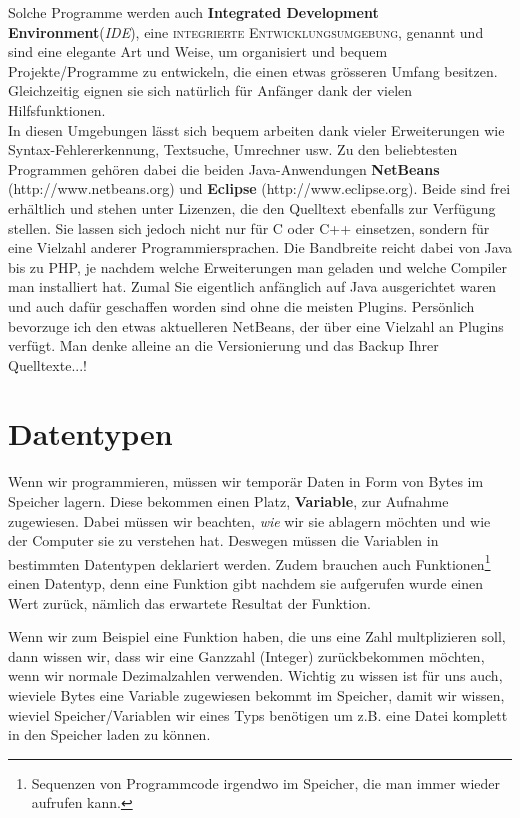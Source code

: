 \documentclass[b5paper,10pt,dvips,fleqn,titlepage,twoside]{book}
\begin{document}
Solche Programme werden auch \textbf{Integrated Development Environment}(\emph{IDE}), eine \textsc{integrierte Entwicklungsumgebung}, genannt und sind eine elegante Art und Weise, um organisiert und bequem Projekte/Programme zu entwickeln, die einen etwas grösseren Umfang besitzen. Gleichzeitig eignen sie sich natürlich für Anfänger dank der vielen Hilfsfunktionen.
\\\newline
In diesen Umgebungen lässt sich bequem arbeiten dank vieler Erweiterungen wie Syntax-Fehlererkennung, Textsuche, Umrechner usw.
Zu den beliebtesten Programmen gehören dabei die beiden Java-Anwendungen \textbf{NetBeans} (http://www.netbeans.org) und \textbf{Eclipse} (http://www.eclipse.org). Beide sind frei erhältlich und stehen unter Lizenzen, die den Quelltext ebenfalls zur Verfügung stellen. Sie lassen sich jedoch nicht nur für C oder C++ einsetzen, sondern für eine Vielzahl anderer Programmiersprachen. Die Bandbreite reicht dabei von Java bis zu PHP, je nachdem welche Erweiterungen man geladen und welche Compiler man installiert hat. Zumal Sie eigentlich anfänglich auf Java ausgerichtet waren und auch dafür geschaffen worden sind ohne die meisten Plugins.
Persönlich bevorzuge ich den etwas aktuelleren NetBeans, der über eine Vielzahl an Plugins verfügt. Man denke alleine an die Versionierung und das Backup Ihrer Quelltexte...!
\chapter{Datentypen}
Wenn wir programmieren, müssen wir temporär Daten in Form von Bytes im Speicher lagern. Diese bekommen einen Platz, \textbf{Variable}, zur Aufnahme zugewiesen. Dabei müssen wir beachten, \emph{wie} wir sie ablagern möchten und wie der Computer sie zu verstehen hat. Deswegen müssen die Variablen in bestimmten Datentypen deklariert werden. Zudem brauchen auch Funktionen\footnote{Sequenzen von Programmcode irgendwo im Speicher, die man immer wieder aufrufen kann.} einen Datentyp, denn eine Funktion gibt nachdem sie aufgerufen wurde einen Wert zurück, nämlich das erwartete Resultat der Funktion.

Wenn wir zum Beispiel eine Funktion haben, die uns eine Zahl multplizieren soll, dann wissen wir, dass wir eine Ganzzahl (Integer) zurückbekommen möchten, wenn wir normale Dezimalzahlen verwenden. Wichtig zu wissen ist für uns auch, wieviele Bytes eine Variable zugewiesen bekommt im Speicher, damit wir wissen, wieviel Speicher/Variablen wir eines Typs benötigen um z.B. eine Datei komplett in den Speicher laden zu können.
\end{document}

